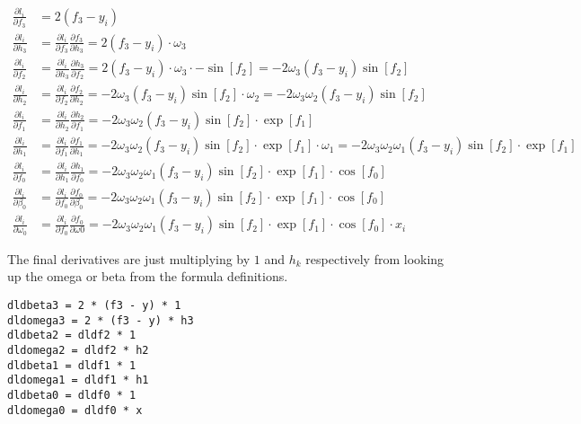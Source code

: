 \documentclass{article}
\begin{document}
\begin{align*}
\frac{\partial{l_{i}}}{\partial{f_{3}}} &= 2(f_{3}- y_{i}) \\
\frac{\partial{l_{i}}}{\partial{h_{3}}} &= \frac{\partial{l_{i}}}{\partial{f_{3}}} \frac{\partial{f_{3}}}{\partial{h_{3}}} = 2(f_{3}- y_{i}) \cdot \omega_{3} \\
\frac{\partial{l_{i}}}{\partial{f_{2}}} &= \frac{\partial{l_{i}}}{\partial{h_{3}}} \frac{\partial{h_{3}}}{\partial{f_{2}}} = 2(f_{3}- y_{i}) \cdot \omega_{3} \cdot - \sin[f_{2}] = - 2 \omega_{3} (f_{3}- y_{i}) \sin[f_{2}] \\
\frac{\partial{l_{i}}}{\partial{h_{2}}} &= \frac{\partial{l_{i}}}{\partial{f_{2}}} \frac{\partial{f_{2}}}{\partial{h_{2}}} = - 2 \omega_{3} (f_{3}- y_{i}) \sin[f_{2}] \cdot \omega_{2} = - 2 \omega_{3} \omega_{2} (f_{3}- y_{i}) \sin[f_{2}] \\
\frac{\partial{l_{i}}}{\partial{f_{1}}} &= \frac{\partial{l_{i}}}{\partial{h_{2}}} \frac{\partial{h_{2}}}{\partial{f_{1}}} = - 2 \omega_{3} \omega_{2} (f_{3}- y_{i}) \sin[f_{2}] \cdot \exp[f_{1}] \\
\frac{\partial{l_{i}}}{\partial{h_{1}}} &= \frac{\partial{l_{i}}}{\partial{f_{1}}} \frac{\partial{f_{1}}}{\partial{h_{1}}} = - 2 \omega_{3} \omega_{2} (f_{3}- y_{i}) \sin[f_{2}] \cdot \exp[f_{1}] \cdot \omega_{1} = - 2 \omega_{3} \omega_{2} \omega_{1} (f_{3}- y_{i}) \sin[f_{2}] \cdot \exp[f_{1}] \\
\frac{\partial{l_{i}}}{\partial{f_{0}}} &= \frac{\partial{l_{i}}}{\partial{h_{1}}} \frac{\partial{h_{1}}}{\partial{f_{0}}} = - 2 \omega_{3} \omega_{2} \omega_{1} (f_{3}- y_{i}) \sin[f_{2}] \cdot \exp[f_{1}] \cdot \cos[f_{0}] \\
\frac{\partial{l_{i}}}{\partial{\beta_{0}}} &= \frac{\partial{l_{i}}}{\partial{f_{0}}} \frac{\partial{f_{0}}}{\partial{\beta_{0}}} = - 2 \omega_{3} \omega_{2} \omega_{1} (f_{3}- y_{i}) \sin[f_{2}] \cdot \exp[f_{1}] \cdot \cos[f_{0}] \\
\frac{\partial{l_{i}}}{\partial{\omega_{0}}} &= \frac{\partial{l_{i}}}{\partial{f_{0}}} \frac{\partial{f_{0}}}{\partial{\omega{0}}} = - 2 \omega_{3} \omega_{2} \omega_{1} (f_{3}- y_{i}) \sin[f_{2}] \cdot \exp[f_{1}] \cdot \cos[f_{0}] \cdot x_{i}
\end{align*}

The final derivatives are just multiplying by $1$ and $h_{k}$ respectively from looking up the omega or beta from the formula definitions.

\begin{verbatim}
dldbeta3 = 2 * (f3 - y) * 1
dldomega3 = 2 * (f3 - y) * h3
dldbeta2 = dldf2 * 1
dldomega2 = dldf2 * h2
dldbeta1 = dldf1 * 1
dldomega1 = dldf1 * h1
dldbeta0 = dldf0 * 1
dldomega0 = dldf0 * x
\end{verbatim}
\end{document}
